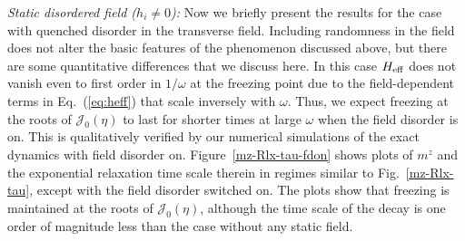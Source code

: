\documentclass[reprint,preprintnumbers,showpacs,amsmath,twocolumn,showkeys,aps,prl]{revtex4-1}
\begin{document}
\noindent
{\it Static disordered field ($h_i\neq 0$):}
Now we briefly present the results for the case with quenched disorder in the transverse field.
Including randomness in the field does not alter the basic features of the phenomenon discussed above, 
but there are some quantitative differences that we discuss here. In this case $H_{\rm eff}$
does not vanish even to first order in $1/\omega$ at the freezing point due to the field-dependent 
terms in Eq.~(\ref{eq:heff}) that scale inversely with $\omega$. Thus, we expect freezing at the roots of 
$\mathcal{J}_0(\eta)$ to last for shorter times at large $\omega$ when the field 
disorder is on. This is qualitatively verified by our numerical simulations of the 
exact dynamics with field disorder on. Figure~\ref{mz-Rlx-tau-fdon} shows plots of $m^z$ and the 
exponential relaxation time scale therein in regimes similar to Fig.~\ref{mz-Rlx-tau}, except with 
the field disorder switched on. The plots show that freezing is maintained at the roots of 
$\mathcal{J}_0(\eta)$, although the time scale of the decay is one order of magnitude less than the 
case without any static field.
\end{document}
